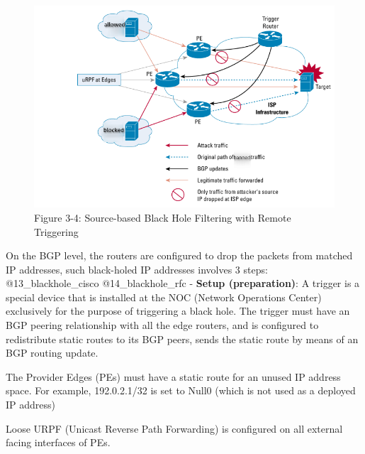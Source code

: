 \begin{figure}
\centering
\includegraphics{res/3-4-cisco-source.png}
\caption{Figure 3-4: Source-based Black Hole Filtering with Remote
Triggering}
\end{figure}

On the BGP level, the routers are configured to drop the packets from
matched IP addresses, such black-holed IP addresses involves 3 steps:
@13\_blackhole\_cisco @14\_blackhole\_rfc - \textbf{Setup
(preparation)}: A trigger is a special device that is installed at the
NOC (Network Operations Center) exclusively for the purpose of
triggering a black hole. The trigger must have an BGP peering
relationship with all the edge routers, and is configured to
redistribute static routes to its BGP peers, sends the static route by
means of an BGP routing update.

The Provider Edges (PEs) must have a static route for an unused IP
address space. For example, 192.0.2.1/32 is set to Null0 (which is not
used as a deployed IP address)

Loose URPF (Unicast Reverse Path Forwarding) is configured on all
external facing interfaces of PEs.


